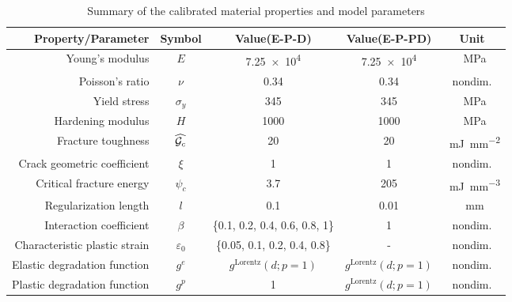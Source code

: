 \begin{table}[htb!]
  \scriptsize
  \centering
  \caption{Summary of the calibrated material properties and model parameters}
  \begin{tabular}{r | c | c | c | c}
    \toprule
    Property/Parameter            & Symbol          & Value(E-P-D)                   & Value(E-P-PD)              & Unit                                       \\
    \midrule
    Young's modulus               & $E$             & \SI{7.25e4}{}                  & \SI{7.25e4}{}              & \SI{}{\mega\pascal}                        \\
    Poisson's ratio               & $\nu$           & 0.34                           & 0.34                       & nondim.                                    \\
    \midrule
    Yield stress                  & $\sigma_y$      & 345                            & 345                        & \SI{}{\mega\pascal}                        \\
    Hardening modulus             & $H$             & 1000                           & 1000                       & \SI{}{\mega\pascal}                        \\
    \midrule
    Fracture toughness            & $\widehat{{\mathcal{G}_c}}$ & 20                             & 20                         & \SI{}{\milli\joule\per\square\milli\meter} \\
    Crack geometric coefficient   & $\xi$           & 1                              & 1                          & nondim.                                    \\
    Critical fracture energy      & $\psi_c$        & 3.7                            & 205                        & \SI{}{\milli\joule\per\cubic\milli\meter}  \\
    Regularization length         & $l$             & 0.1                            & 0.01                       & \SI{}{\milli\meter}                        \\
    \midrule
    Interaction coefficient       & $\beta$         & \{0.1, 0.2, 0.4, 0.6, 0.8, 1\} & 1                          & nondim.                                    \\
    Characteristic plastic strain & $\varepsilon_0$ & \{0.05, 0.1, 0.2, 0.4, 0.8\}   & -                          & nondim.                                    \\
    Elastic degradation function  & $g^e$           & $g^\text{Lorentz}(d; p=1)$     & $g^\text{Lorentz}(d; p=1)$ & nondim.                                    \\
    Plastic degradation function  & $g^p$           & 1                              & $g^\text{Lorentz}(d; p=1)$ & nondim.                                    \\
    \bottomrule
  \end{tabular}
  \label{tab: Chapter5/3pb}
\end{table}

